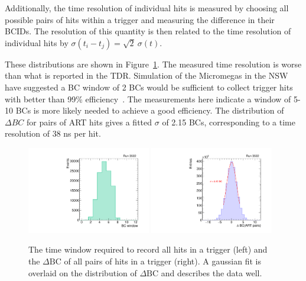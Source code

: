 Additionally, the time resolution of individual hits is measured by choosing all possible pairs of hits within a trigger and measuring the difference in their BCIDs. The resolution of this quantity is then related to the time resolution of individual hits by $\sigma(t_i - t_j) = \sqrt{2}\ \sigma(t)$.

These distributions are shown in Figure~\ref{fig:time}. The measured time resolution is worse than what is reported in the TDR. Simulation of the Micromegas in the NSW have suggested a BC window of 2 BCs would be sufficient to collect trigger hits with better than 99\% efficiency~\cite{koki}. The measurements here indicate a window of 5-10 BCs is more likely needed to achieve a good efficiency. The distribution of $\Delta BC$ for pairs of ART hits gives a fitted $\sigma$ of 2.15 BCs, corresponding to a time resolution of 38 ns per hit.

\begin{figure}[!htpb]
  \begin{center}
    \includegraphics[width=0.48\textwidth]{figures/gbtanalysis3522/artwin_lin.pdf}
    \includegraphics[width=0.48\textwidth]{figures/gbtanalysis3522/artrpairs_lin.pdf}
  \end{center}
  \vspace{-10pt}
  \caption{The time window required to record all hits in a trigger (left) and the $\Delta\text{BC}$ of all pairs of hits in a trigger (right). A gaussian fit is overlaid on the distribution of $\Delta\text{BC}$ and describes the data well.}
  \label{fig:time}
\end{figure}

